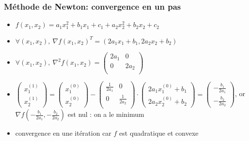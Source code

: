 \documentclass{beamer}
\begin{document}
\begin{frame}
  \frametitle{Méthode de Newton: convergence en un pas}

  \begin{itemize}
  \item $f(x_1,x_2) = a_1x_1^2 + b_1x_1 + c_1 + a_2x_2^2 + b_2x_2 + c_2$
  \item 
    $\forall (x_1,x_2), \ {\nabla f}(x_1,x_2)^T = (2a_1x_1 + b_1,2a_2x_2 + b_2)$
  \item 
  $ \forall (x_1,x_2), \ \nabla^2f(x_1,x_2) =
  \left(\begin{array}{cc}
    2a_1 & 0 \\
    0 & 2a_2 \\
  \end{array}
  \right)
  $
  \end{itemize}

  \begin{itemize}
  \item $\left( \begin{array}{c} x_1^{(1)} \\ x_2^{(1)} \end{array} \right ) =
    \left( \begin{array}{c} x_1^{(0)} \\ x_2^{(0)} \end{array} \right ) -
  \left(\begin{array}{cc} \frac{1}{2a_1} & 0 \\ 0 & \frac{1}{2a_2} \\ \end{array} \right) \cdot
  \left( \begin{array}{c} 2a_1x_1^{(0)} + b_1 \\ 2a_2x_2^{(0)} + b_2 \end{array} \right ) =
  \left( \begin{array}{c} -\frac{b_1}{2a_1} \\ -\frac{b_2}{2a_2} \end{array} \right ) $, or
  ${\nabla f}(-\frac{b_1}{2a_1}, -\frac{b_2}{2a_2})$ est nul : on a le minimum
  \item \alert{convergence en une itération car $f$ est quadratique et convexe}
  \end{itemize}
  
\end{frame}
\end{document}
